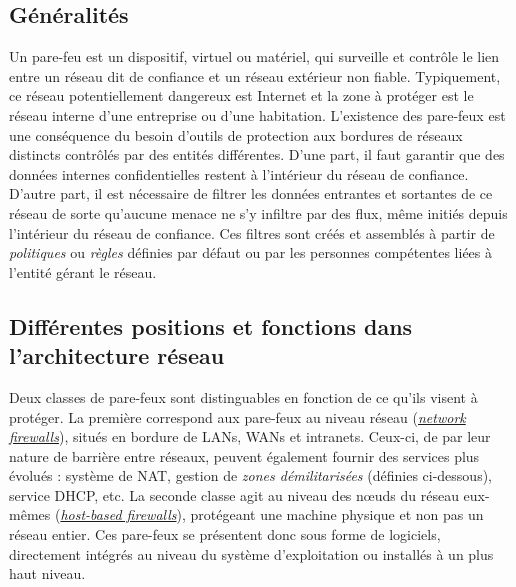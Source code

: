 \documentclass[]{article}
\begin{document}
\subsection{Généralités}\label{gen_FW}

Un pare-feu est un dispositif, virtuel ou matériel, qui surveille et contrôle le lien entre un réseau dit de confiance et un réseau extérieur non fiable. Typiquement, ce réseau potentiellement dangereux est Internet et la zone à protéger est le réseau interne d'une entreprise ou d'une habitation. L'existence des pare-feux est une conséquence du besoin d'outils de protection aux bordures de réseaux distincts contrôlés par des entités différentes. D'une part, il faut garantir que des données internes confidentielles restent à l'intérieur du réseau de confiance. D'autre part, il est nécessaire de filtrer les données entrantes et sortantes de ce réseau de sorte qu'aucune menace ne s'y infiltre par des flux, même initiés depuis l'intérieur du réseau de confiance. Ces filtres sont créés et assemblés à partir de \textit{politiques} ou \textit{règles} définies par défaut ou par les personnes compétentes liées à l'entité gérant le réseau.

\subsection{Différentes positions et fonctions dans l'architecture réseau}

\par Deux classes de pare-feux sont distinguables en fonction de ce qu'ils visent à protéger. La première correspond aux pare-feux au niveau réseau (\hyperref[netw_fw]{\textit{network firewalls}}), situés en bordure de LANs, WANs et intranets. Ceux-ci, de par leur nature de barrière entre réseaux, peuvent également fournir des services plus évolués : système de NAT, gestion de \textit{zones démilitarisées} (définies ci-dessous), service DHCP, etc. \cite{Shimonski2013} La seconde classe agit au niveau des nœuds du réseau eux-mêmes (\hyperref[host_fw]{\textit{host-based firewalls}}), protégeant une machine physique et non pas un réseau entier. Ces pare-feux se présentent donc sous forme de logiciels, directement intégrés au niveau du système d'exploitation ou installés à un plus haut niveau.\\
\end{document}

